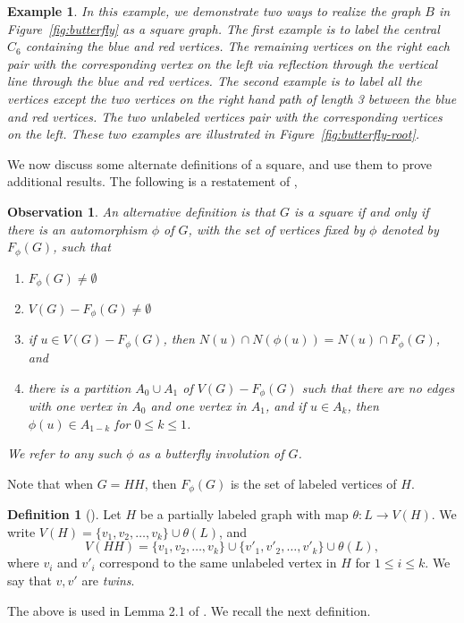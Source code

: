 \documentclass{article}
\newtheorem{observation}[theorem]{Observation}
\newtheorem{example}[theorem]{Example}
\theoremstyle{definition}
\newtheorem{definition}[theorem]{Definition}
\begin{document}
\begin{example} \rm \label{exa:butterfly} 
In this example, we demonstrate two ways to realize the graph $B$ in Figure~\ref{fig:butterfly} as a square graph. The first example is to label the central $C_6$ containing the blue and red vertices. The remaining vertices on the right each pair with the corresponding vertex on the left via reflection through the vertical line through the blue and red vertices. The second example is to label all the vertices except the two vertices on the right hand path of length 3 between the blue and red vertices. The two unlabeled vertices pair with the corresponding vertices on the left. These two examples are illustrated in Figure~\ref{fig:butterfly-root}.
\end{example}

We now discuss some alternate definitions of a square, and use them to prove additional results. The following is a restatement of \cite[Lemma 2.8]{BRST20}, 
\begin{observation} \label{obs:alt-defn} 
An alternative definition is that $G$ is a square  if and only if there is an automorphism $\phi$ of $G$, with the set of vertices fixed by $\phi$ denoted by $F_{\phi}(G)$, such that 
\begin{enumerate} 
\item $F_{\phi}(G)\neq \emptyset$
\item $V(G)-F_{\phi}(G)\neq \emptyset$
\item if $u\in V(G)-F_{\phi}(G)$, then $N(u)\cap N(\phi(u))=N(u)\cap F_{\phi}(G)$, and 
\item there is a partition $A_0\cup A_1$ of $V(G)-F_{\phi}(G)$ such that there are no edges with one vertex in $A_0$ and one vertex in $A_1$, and if $u\in A_k$, then $\phi(u) \in A_{1-k}$ for $0 \leq k \leq 1$.
\end{enumerate} 

We refer to any such $\phi$ as a \textit{butterfly involution} of $G$.  
\end{observation}

Note that when $G=HH$, then $F_{\phi}(G)$ is the set of labeled vertices of $H$. 

\begin{definition}[\cite{AAP}] \label{def:original} \rm Let $H$ be a partially labeled graph with map $\theta:L\rightarrow V(H)$. We write $V(H)=\{v_1, v_2, \ldots, v_k\}\cup \theta(L)$, and
$$
V(HH)=\{v_1, v_2, \ldots, v_k\} \cup \{v'_1, v'_2, \ldots, v'_k\}\cup\theta(L),
$$ 
where $v_i$ and $v'_i$ correspond to the same unlabeled vertex in $H$ for $1\leq i\leq k$. We say that $v,v'$ are \emph{twins}.
\end{definition} 
The above is used in Lemma 2.1 of \cite{AAP}.  We recall the next definition. 
\end{document}
